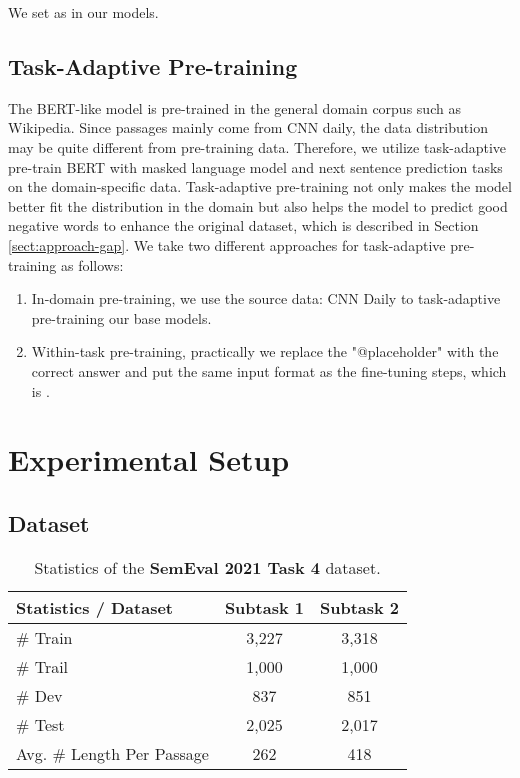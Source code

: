 \documentclass[11pt,a4paper]{article}
\begin{document}
We set  as  in our models.

\subsection{Task-Adaptive Pre-training}
\label{sec_pretrain}
The BERT-like model is pre-trained in the general domain corpus such as Wikipedia. 
Since passages mainly come from CNN daily, the data distribution may be quite different from pre-training data.
Therefore, we utilize task-adaptive pre-train BERT with masked language model and next sentence prediction tasks on the domain-specific data. 
Task-adaptive pre-training not only makes the model better fit the distribution in the domain but also helps the model to predict good negative words to enhance the original dataset, which is described in Section \ref{sect:approach-gap}. 
We take two different approaches for task-adaptive pre-training as follows:

\begin{enumerate}[1)]
\item In-domain pre-training, we use the source data: CNN Daily to task-adaptive pre-training our base models\cite{sun_how_2020}. 

\item Within-task pre-training, practically we replace the "@placeholder" with the correct answer and put the same input format as the fine-tuning steps, which is  \cite{noauthor_200410964_nodate}.
\end{enumerate}

\section{Experimental Setup}

\subsection{Dataset}
\begin{table}[!t]
\centering
\small
\begin{tabular}{p{4cm}cc}
         \toprule
         \textbf{Statistics / Dataset} & \textbf{Subtask 1} & \textbf{Subtask 2}  \\
         \midrule
         \# Train& 3,227& 3,318\\
         \# Trail& 1,000& 1,000 \\
         \# Dev& 837& 851\\
         \# Test& 2,025& 2,017\\
         Avg. \# Length Per Passage&262 &418   \\
         \bottomrule
    \end{tabular}
\caption{Statistics of the \textbf{SemEval 2021 Task 4} dataset.}
    \label{dataset}
\end{table}
\end{document}
